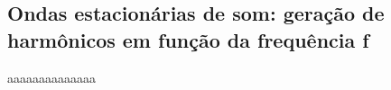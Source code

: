 \subsection{Ondas estacionárias de som: geração de harmônicos
em função da frequência f}

aaaaaaaaaaaaaa
